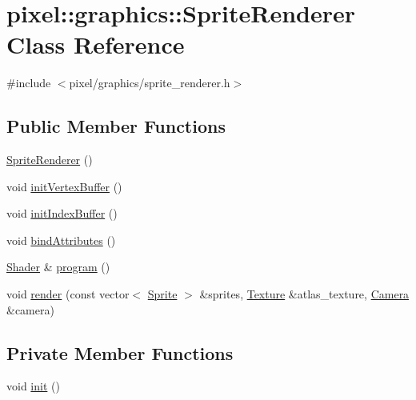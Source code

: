 \hypertarget{classpixel_1_1graphics_1_1_sprite_renderer}{}\section{pixel\+:\+:graphics\+:\+:Sprite\+Renderer Class Reference}
\label{classpixel_1_1graphics_1_1_sprite_renderer}


{\ttfamily \#include $<$pixel/graphics/sprite\+\_\+renderer.\+h$>$}

\subsection*{Public Member Functions}
\begin{DoxyCompactItemize}
\item 
\hyperlink{classpixel_1_1graphics_1_1_sprite_renderer_ab219129e7daaed12d3a1d0d5a9618402}{Sprite\+Renderer} ()
\item 
void \hyperlink{classpixel_1_1graphics_1_1_sprite_renderer_a66ff7b1d35ad44de0a2c9d9bd516720f}{init\+Vertex\+Buffer} ()
\item 
void \hyperlink{classpixel_1_1graphics_1_1_sprite_renderer_af112b3ef11ae6aaf0af85eb55f8b978e}{init\+Index\+Buffer} ()
\item 
void \hyperlink{classpixel_1_1graphics_1_1_sprite_renderer_adde03c0498d641727b1d4aa4e03ab2fd}{bind\+Attributes} ()
\item 
\hyperlink{classpixel_1_1graphics_1_1_shader}{Shader} \& \hyperlink{classpixel_1_1graphics_1_1_sprite_renderer_a88df5a17361010139f2cbdd2c19623c5}{program} ()
\item 
void \hyperlink{classpixel_1_1graphics_1_1_sprite_renderer_a448ec6ae78cb0cb292e9354405ac42b2}{render} (const vector$<$ \hyperlink{classpixel_1_1graphics_1_1_sprite}{Sprite} $>$ \&sprites, \hyperlink{classpixel_1_1graphics_1_1_texture}{Texture} \&atlas\+\_\+texture, \hyperlink{classpixel_1_1graphics_1_1_camera}{Camera} \&camera)
\end{DoxyCompactItemize}
\subsection*{Private Member Functions}
\begin{DoxyCompactItemize}
\item 
void \hyperlink{classpixel_1_1graphics_1_1_sprite_renderer_a7e450b97265b4a9aa6f881543629d053}{init} ()
\end{DoxyCompactItemize}
